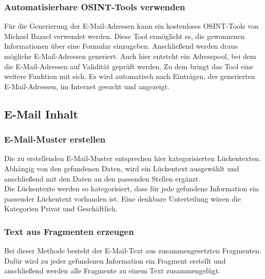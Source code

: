 		\subsubsection{Automatisierbare OSINT-Tools verwenden}
		Für die Generierung der E-Mail-Adressen kann ein kostenloses OSINT-Tools von Michael Bazzel verwendet werden. Diese Tool ermöglicht es, die gewonnenen Informationen über eine Formular einzugeben. Anschließend werden draus mögliche E-Mail-Adressen generiert. Auch hier entsteht ein Adresspool, bei dem die E-Mail-Adressen auf Validität geprüft werden. Zu dem bringt das Tool eine weitere Funktion mit sich. Es wird automatisch nach Einträgen, der generierten E-Mail-Adressen, im Internet gesucht und angezeigt. \cite{EmailAssumptions}

	\subsection{E-Mail Inhalt}
		\subsubsection{E-Mail-Muster erstellen}
		Die zu erstellenden E-Mail-Muster entsprechen hier kategorisierten Lückentexten. Abhängig von den gefundenen Daten, wird ein Lückentext ausgewählt und anschließend mit den Daten an den passenden Stellen ergänzt.\\
		Die Lückentexte werden so kategorisiert, dass für jede gefundene Information ein passender Lückentext vorhanden ist. Eine denkbare Unterteilung wären die Kategorien Privat und Geschäftlich.
		\subsubsection{Text aus Fragmenten erzeugen}
		Bei dieser Methode besteht der E-Mail-Text aus zusammengesetzten Fragmenten. Dafür wird zu jeder gefundenen Information ein Fragment erstellt und anschließend werden alle Fragmente zu einem Text zusammengefügt.
		
		
		
